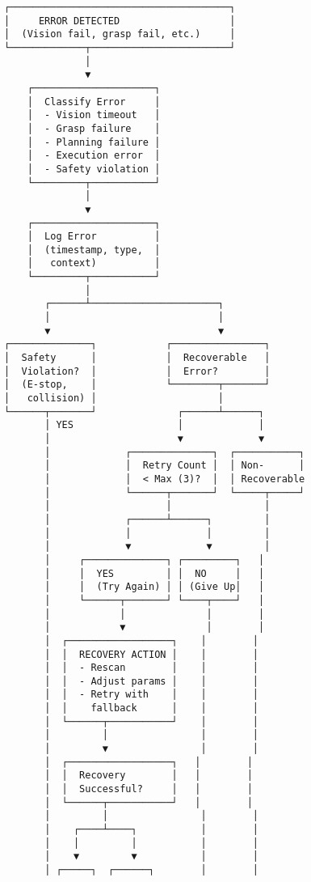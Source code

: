 \documentclass[
]{article}
\begin{document}
\begin{verbatim}
┌──────────────────────────────────────┐
│     ERROR DETECTED                   │
│  (Vision fail, grasp fail, etc.)     │
└─────────────┬────────────────────────┘
              │
              ▼
    ┌─────────────────────┐
    │  Classify Error     │
    │  - Vision timeout   │
    │  - Grasp failure    │
    │  - Planning failure │
    │  - Execution error  │
    │  - Safety violation │
    └─────────┬───────────┘
              │
              ▼
    ┌─────────────────────┐
    │  Log Error          │
    │  (timestamp, type,  │
    │   context)          │
    └─────────┬───────────┘
              │
       ┌──────┴──────────────────────┐
       │                             │
       ▼                             ▼
┌──────────────┐            ┌────────────────┐
│  Safety      │            │  Recoverable   │
│  Violation?  │            │  Error?        │
│  (E-stop,    │            └────────┬───────┘
│   collision) │                     │
└──────┬───────┘              ┌──────┴──────┐
       │ YES                  │             │
       │                      ▼             ▼
       │             ┌──────────────┐  ┌───────────┐
       │             │  Retry Count │  │ Non-      │
       │             │  < Max (3)?  │  │ Recoverable
       │             └──────┬───────┘  └─────┬─────┘
       │                    │                │
       │             ┌──────┴──────┐         │
       │             │             │         │
       │             ▼             ▼         │
       │     ┌──────────────┐ ┌─────────┐   │
       │     │  YES         │ │  NO     │   │
       │     │  (Try Again) │ │ (Give Up│   │
       │     └──────┬───────┘ └────┬────┘   │
       │            │              │        │
       │            ▼              │        │
       │  ┌──────────────────┐    │        │
       │  │  RECOVERY ACTION │    │        │
       │  │  - Rescan        │    │        │
       │  │  - Adjust params │    │        │
       │  │  - Retry with    │    │        │
       │  │    fallback      │    │        │
       │  └──────┬───────────┘    │        │
       │         │                │        │
       │         ▼                │        │
       │  ┌──────────────────┐   │        │
       │  │  Recovery        │   │        │
       │  │  Successful?     │   │        │
       │  └──────┬───────────┘   │        │
       │         │                │        │
       │    ┌────┴────┐           │        │
       │    │         │           │        │
       │    ▼         ▼           │        │
       │ ┌─────┐  ┌──────┐        │        │

\end{verbatim}
\end{document}

